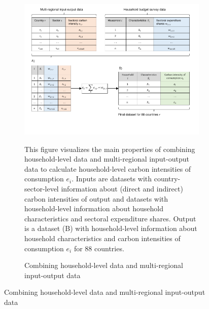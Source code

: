 \begin{figure}[ht!]
  \centering
  \caption{Graphical representation of data work} \label{fig:data_visualisation}
  \begin{subfigure}[b]{\textwidth}
  \centering
    \caption{Combining household-level data and multi-regional input-output data} \label{fig:data_visualisation_1}
  \includegraphics{1_Figures/Figures_Appendix/Graphical representation of data work_1.pdf}
  \begin{subcaption2}
    This figure visualizes the main properties of combining household-level data and multi-regional input-output data to calculate household-level carbon intensities of consumption $e_{i}$. Inputs are datasets with country-sector-level information about (direct and indirect) carbon intensities of output and datasets with household-level information about household characteristics and sectoral expenditure shares. Output is a dataset (B) with household-level information about household characteristics and carbon intensities of consumption $e_{i}$ for 88 countries.
  \end{subcaption2}
  \end{subfigure}
\end{figure}

\clearpage

